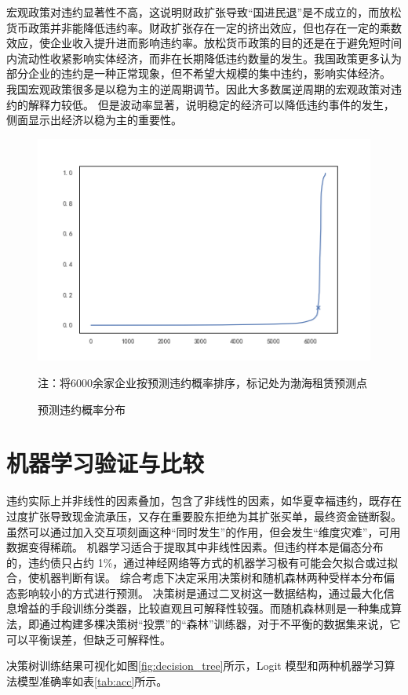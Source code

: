 宏观政策对违约显著性不高，这说明财政扩张导致“国进民退”是不成立的，而放松货币政策并非能降低违约率。财政扩张存在一定的挤出效应，但也存在一定的乘数效应，使企业收入提升进而影响违约率。放松货币政策的目的还是在于避免短时间内流动性收紧影响实体经济，而非在长期降低违约数量的发生。我国政策更多认为部分企业的违约是一种正常现象，但不希望大规模的集中违约，影响实体经济。
我国宏观政策很多是以稳为主的逆周期调节。因此大多数属逆周期的宏观政策对违约的解释力较低。
但是波动率显著，说明稳定的经济可以降低违约事件的发生，侧面显示出经济以稳为主的重要性。
\begin{figure}[ht]
	\includegraphics[width=0.9\linewidth]{./data/渤海银行.png}
	\caption{预测违约概率分布}
	\label{fig:bhyh}
	\qquad \small{注：将6000余家企业按预测违约概率排序，标记处为渤海租赁预测点}
\end{figure}


\section{机器学习验证与比较}
违约实际上并非线性的因素叠加，包含了非线性的因素，如华夏幸福违约，既存在过度扩张导致现金流承压，又存在重要股东拒绝为其扩张买单，最终资金链断裂。虽然可以通过加入交互项刻画这种“同时发生”的作用，但会发生“维度灾难”，可用数据变得稀疏。
机器学习适合于提取其中非线性因素。但违约样本是偏态分布的，违约债只占约 1\%，通过神经网络等方式的机器学习极有可能会欠拟合或过拟合，使机器判断有误。
综合考虑下决定采用决策树和随机森林两种受样本分布偏态影响较小的方式进行预测。
决策树是通过二叉树这一数据结构，通过最大化信息增益的手段训练分类器，比较直观且可解释性较强。而随机森林则是一种集成算法，即通过构建多棵决策树“投票”的“森林”训练器，对于不平衡的数据集来说，它可以平衡误差，但缺乏可解释性。

决策树训练结果可视化如图\ref{fig:decision_tree}所示，Logit 模型和两种机器学习算法模型准确率如表\ref{tab:acc}所示。

